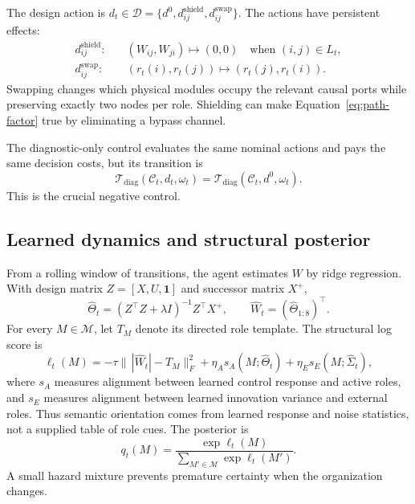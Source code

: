 \documentclass[11pt,a4paper]{article}
\numberwithin{equation}{section}
\newcommand{\Mset}{\mathcal{M}}
\newcommand{\Corg}{\mathcal{C}}
\newcommand{\Tmap}{\mathcal{T}}
\begin{document}
The design action is $d_t\in\mathcal D=\{d^0,d^{\mathrm{shield}}_{ij},
d^{\mathrm{swap}}_{ij}\}$. The actions have persistent effects:
\begin{align}
 d^{\mathrm{shield}}_{ij}:&\quad
 (W_{ij},W_{ji})\mapsto(0,0)
 \quad\text{when }(i,j)\in L_t, \\
 d^{\mathrm{swap}}_{ij}:&\quad
 (r_t(i),r_t(j))\mapsto(r_t(j),r_t(i)).
 \label{eq:design-actions}
\end{align}
Swapping changes which physical modules occupy the relevant causal ports
while preserving exactly two nodes per role. Shielding can make
Equation~\eqref{eq:path-factor} true by eliminating a bypass channel.

The diagnostic-only control evaluates the same nominal actions and pays the
same decision costs, but its transition is
\begin{equation}
 \Tmap_{\mathrm{diag}}(\Corg_t,d_t,\omega_t)
 =\Tmap_{\mathrm{diag}}(\Corg_t,d^0,\omega_t).
 \label{eq:diagnostic-null}
\end{equation}
This is the crucial negative control.

\subsection{Learned dynamics and structural posterior}

From a rolling window of transitions, the agent estimates $W$ by ridge
regression. With design matrix $Z=[X,U,\mathbf 1]$ and successor matrix $X^+$,
\begin{equation}
 \widehat\Theta_t=(Z^\top Z+\lambda I)^{-1}Z^\top X^+,
 \qquad \widehat W_t=(\widehat\Theta_{1:8})^\top.
 \label{eq:ridge}
\end{equation}
For every $M\in\Mset$, let $T_M$ denote its directed role template. The
structural log score is
\begin{equation}
 \ell_t(M)=-\tau\|\,|\widehat W_t|-T_M\|_F^2
 +\eta_A s_A(M;\widehat\Theta_t)
 +\eta_E s_E(M;\widehat\Sigma_t),
 \label{eq:structural-score}
\end{equation}
where $s_A$ measures alignment between learned control response and active
roles, and $s_E$ measures alignment between learned innovation variance and
external roles. Thus semantic orientation comes from learned response and
noise statistics, not a supplied table of role cues. The posterior is
\begin{equation}
 q_t(M)=\frac{\exp\ell_t(M)}{\sum_{M'\in\Mset}\exp\ell_t(M')}.
 \label{eq:partition-posterior}
\end{equation}
A small hazard mixture prevents premature certainty when the organization
changes.
\end{document}
